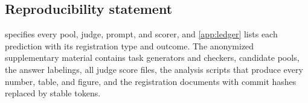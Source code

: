 \documentclass{article}
\begin{document}
\subsection*{Reproducibility statement}
 specifies every pool, judge, prompt, and scorer, and \cref{app:ledger} lists each prediction with its registration type and outcome. The anonymized supplementary material contains task generators and checkers, candidate pools, the answer labelings, all judge score files, the analysis scripts that produce every number, table, and figure, and the registration documents with commit hashes replaced by stable tokens.




\newpage
\appendix
{}

\end{document}
